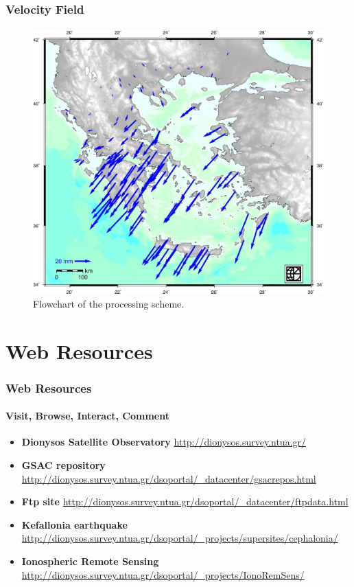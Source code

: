 \documentclass{beamer}
\begin{document}
\begin{frame}\frametitle{Velocity Field}\framesubtitle{}
 \begin{figure}
 \begin{center}
 \includegraphics[width=.8\textwidth]{img/testvel.jpg}
 \caption{Flowchart of the processing scheme.}
 \label{fig:dgrm}
 \end{center}
 \end{figure}
\end{frame}

\section{Web Resources}

\begin{frame}\frametitle{Web Resources}\framesubtitle{Visit, Browse, Interact, Comment}
\begin{itemize}
    \item \textbf{Dionysos Satellite Observatory} \url{http://dionysos.survey.ntua.gr/}  %
    \item \textbf{GSAC repository} \url{http://dionysos.survey.ntua.gr/dsoportal/_datacenter/gsacrepos.html} %
    \item \textbf{Ftp site} \url{http://dionysos.survey.ntua.gr/dsoportal/_datacenter/ftpdata.html}  %
    \item \textbf{Kefallonia earthquake} \url{http://dionysos.survey.ntua.gr/dsoportal/_projects/supersites/cephalonia/}  %
    \item \textbf{Ionospheric Remote Sensing} \url{http://dionysos.survey.ntua.gr/dsoportal/_projects/IonoRemSens/}  %
\end{itemize}
\end{frame}
\end{document}
